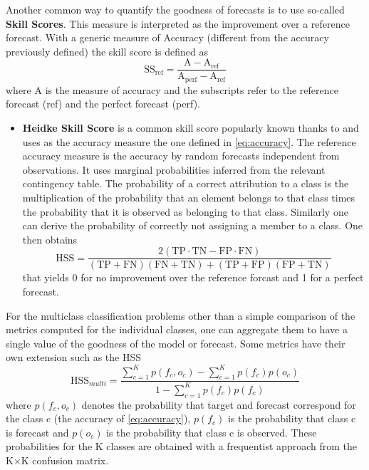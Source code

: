Another common way to quantify the goodness of forecasts is to use so-called \textbf{Skill Scores}. This measure is interpreted as the improvement over a reference forecast. With a generic measure of Accuracy (different from the accuracy previously defined) the skill score is defined as
\begin{equation}
    \text{SS}_\text{ref} = \dfrac{\text{A} - \text{A}_\text{ref}}{\text{A}_\text{perf} - \text{A}_\text{ref}}
\end{equation}
where A is the measure of accuracy and the subscripts refer to the reference forecast (ref) and the perfect forecast (perf).
\begin{itemize}
    \item \textbf{Heidke Skill Score} is a common skill score popularly known thanks to \citet{Heidke1926CalculationService} and uses as the accuracy measure the one defined in \cref{eq:accuracy}. The reference accuracy measure is the accuracy by random forecasts independent from observations. It uses marginal probabilities inferred from the relevant contingency table. The probability of a correct attribution to a class is the multiplication of the probability that an element belongs to that class times the probability that it is observed as belonging to that class. Similarly one can derive the probability of correctly not assigning a member to a class. One then obtains
    \begin{equation}
        \text{HSS} = \dfrac{2(\text{TP}\cdot\text{TN}-\text{FP}\cdot\text{FN})}{(\text{TP}+\text{FN})(\text{FN}+\text{TN}) + (\text{TP}+\text{FP})(\text{FP}+\text{TN})}
    \end{equation}
    that yields 0 for no improvement over the reference forcast and 1 for a perfect forecast.
\end{itemize}

For the multiclass classification problems other than a simple comparison of the metrics computed for the individual classes, one can aggregate them to have a single value of the goodness of the model or forecast. Some metrics have their own extension such as the HSS
\begin{equation}
    \text{HSS}_{multi} = \dfrac{\sum_{c=1}^{K}p(f_c,o_c)-\sum_{c=1}^{K}p(f_c)p(o_c)}{1-\sum_{c=1}^{K}p(f_c)p(f_c)}
\end{equation}
where $p(f_c,o_c)$ denotes the probability that target and forecast correspond for the class c (the accuracy of \cref{eq:accuracy}), $p(f_c)$ is the probability that class c is forecast and $p(o_c)$ is the probability that class c is observed. These probabilities for the K classes are obtained with a frequentist approach from the K$\times$K confusion matrix.

